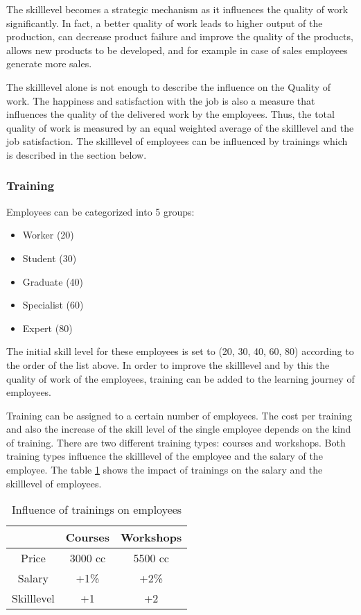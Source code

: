 The skilllevel becomes a strategic mechanism as it influences the quality of work significantly. In fact, a better quality of work leads to higher output of the production, can decrease product failure and improve the quality of the products, allows new products to be developed, and for example in case of sales employees generate more sales. 

The skilllevel alone is not enough to describe the influence on the Quality of work. The happiness and satisfaction with the job is also a measure that influences the quality of the delivered work by the employees.
Thus, the total quality of work is measured by an equal weighted average of the skilllevel and the job satisfaction. The skilllevel of employees can be influenced by trainings which is described in the section below.

\subsubsection{Training}
Employees can be categorized into 5 groups:
\begin{itemize}
    \item Worker (20)
    \item Student (30)
    \item Graduate (40)
    \item Specialist (60)
    \item Expert (80)
\end{itemize}
The initial skill level for these employees is set to (20, 30, 40, 60, 80) according to the order of the list above. In order to improve the skilllevel and by this the quality of work of the employees, training can be added to the learning journey of employees. 

Training can be assigned to a certain number of employees. The cost per training and also the increase of the skill level of the single employee depends on the kind of training. There are two different training types: courses and workshops. Both training types influence the skilllevel of the employee and the salary of the employee. The  table \ref{tab:trainings_employees} shows the impact of trainings on the salary and the skilllevel of employees.

\begin{table}
    \centering
\begin{tabular}{c|c|c}
    \hline
     & \textbf{Courses} & \textbf{Workshops} \\
     \hline \hline
     Price & 3000 cc & 5500 cc \\
     Salary & +1\% & +2\%  \\
     Skilllevel & +1 & +2  \\
     \hline
\end{tabular}
\caption{Influence of trainings on employees}
    \label{tab:trainings_employees}
\end{table}


